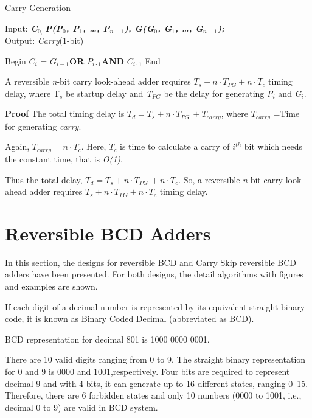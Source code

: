 \begin{algorithm}[!tbh]
	\caption{Carry Generation}
	\label{alg:part1_c2_alg5}
	Input: {\bf {\it C${}_{0,\ }$P(P${}_{0}$, P${}_{1}$, {\dots}, P${}_{n-1}$), G(G${}_{0}$, G${}_{1}$, {\dots}, G${}_{n-1}$);}}\\
	Output: {{ \textit{Carry}(1-bit)}}
	\begin{algorithmic}[1]
		\STATE Begin
		\STATE $C{}_{i}$ = $G{}_{i-1}${\bf OR} $P{}_{i\cdot 1}${\bf AND} $C{}_{i\cdot 1}$
		\ENDFOR
		\STATE End
	\end{algorithmic}
\end{algorithm}
\begin{property}\textnormal{
	A reversible {\it n}-bit carry look-ahead adder requires {$T{}_{s} + n \cdot T{}_{PG}+ n \cdot T{}_{c}$} timing delay, where T${}_{s}$ be startup delay and {\it T${}_{PG}$} be the delay for generating {\it P${}_{i}$} and {\it G${}_{i}$}.} 
\end{property}

\noindent\textbf{Proof}{
	The total timing delay is	
	{$T{}_{d} = T{}_{s}+n\cdot T{}_{PG\ }+T{}_{carry}$}, where {$T{}_{carry}$} =Time for generating {\it carry}.}

\textnormal{	
Again, {$T{}_{carry} = n \cdot T{}_{c}$}. Here, {$T{}_{c}$} is time to calculate a carry of {$i{}^{th}$} bit which needs the constant time, that is {\it O(1)}.} 

\textnormal{	
 Thus the total delay, {$T{}_{d} = T{}_{s} + n \cdot T{}_{PG\ }+ n \cdot T{}_{c}$}. So, a reversible {\it n}-bit carry look-ahead adder requires {$T{}_{s} + n \cdot T{}_{PG} + n \cdot T{}_{c}$} timing delay.}


\section{Reversible BCD Adders}
In this section, the designs for reversible BCD and Carry Skip reversible BCD adders have been presented. For both designs, the detail algorithms with figures and examples are shown.
\begin{property}\textnormal{
	If each digit of a decimal number is represented by its equivalent straight binary code, it is known as Binary Coded Decimal (abbreviated as BCD).}
\end{property}
\begin{example}\textnormal{
	BCD representation for decimal 801 is 1000 0000 0001.}

\textnormal{There are 10 valid digits ranging from 0 to 9. The straight binary representation for 0 and 9 is 0000 and 1001,respectively. Four bits are required to represent decimal 9 and with 4 bits, it can generate up to 16 different states, ranging 0--15. Therefore, there are 6 forbidden states and only 10 numbers (0000 to 1001, i.e., decimal 0 to 9) are valid in BCD system.}
\end{example}


